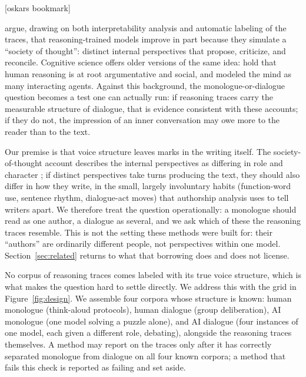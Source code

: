 \documentclass[11pt]{article}
\begin{document}
[oskars bookmark] 

\citet{kim2026societies} argue,
drawing on both interpretability analysis and automatic labeling of the
traces, that reasoning-trained models improve in part because they simulate a
``society of thought'': distinct internal perspectives that propose,
criticize, and reconcile. Cognitive science offers older versions of the same
idea: \citet{mercier2017enigma} hold that human reasoning is at root
argumentative and social, and \citet{minsky1986society} modeled the mind as
many interacting agents. Against this background, the monologue-or-dialogue
question becomes a test one can actually run: if reasoning traces carry the
measurable structure of dialogue, that is evidence consistent with these
accounts; if they do not, the impression of an inner conversation may owe
more to the reader than to the text.

Our premise is that voice structure leaves marks in the writing itself. The
society-of-thought account describes the internal perspectives as differing
in role and character \citep{kim2026societies}; if distinct perspectives take
turns producing the text, they should also differ in how they write, in the
small, largely involuntary habits (function-word use, sentence rhythm,
dialogue-act moves) that authorship analysis uses to tell writers apart. We
therefore treat the question operationally: a monologue should read as one
author, a dialogue as several, and we ask which of these the reasoning traces
resemble. This is not the setting these methods were built for: their
``authors'' are ordinarily different people, not perspectives within one
model. Section~\ref{sec:related} returns to what that borrowing does and
does not license.

No corpus of reasoning traces comes labeled with its true voice structure,
which is what makes the question hard to settle directly. We address this with
the grid in Figure~\ref{fig:design}. We assemble four corpora whose structure
is known: human monologue (think-aloud protocols), human dialogue (group
deliberation), AI monologue (one model solving a puzzle alone), and AI
dialogue (four instances of one model, each given a different role,
debating), alongside the reasoning traces themselves. A method may report on
the traces only after it has correctly separated monologue from dialogue on
all four known corpora; a method that fails this check is reported as failing
and set aside.
\end{document}

